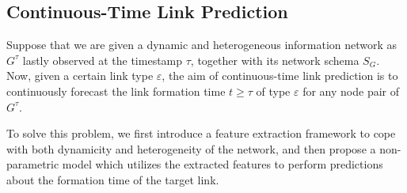 \subsection{Continuous-Time Link Prediction}
Suppose that we are given a dynamic and heterogeneous information network as $G^{\tau}$ lastly observed at the timestamp $\tau$, together with its network schema $S_G$. Now, given a certain link type $\varepsilon$, the aim of continuous-time link prediction is to continuously forecast the link formation time $t\ge \tau$ of type $\varepsilon$ for any node pair of $G^{\tau}$.

To solve this problem, we first introduce a feature extraction framework to cope with both dynamicity and heterogeneity of the network, and then propose a non-parametric model which utilizes the extracted features to perform predictions about the formation time of the target link.

